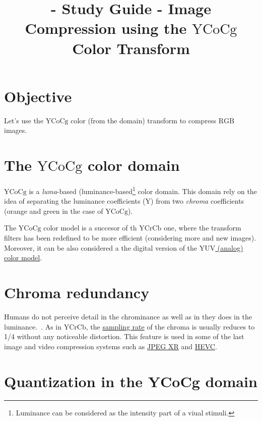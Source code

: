 
 \title{\SM{} - Study Guide - Image
  Compression using the $\text{YCoCg}$ Color Transform}

\maketitle
\tableofcontents

\section{Objective}
Let's use the
\href{https://en.wikipedia.org/wiki/YCbCr}{$\text{YCoCg}$} color (from
the  domain) transform to compress $\text{RGB}$ images.

\section{The $\text{YCoCg}$ color domain}
$\text{YCoCg}$ is a \emph{luma}-based
(luminance-based\footnote{Luminance can be considered as the intensity
part of a viual stimuli.} color domain. This domain rely on the idea
of separating the luminance coefficients (Y) from two \emph{chroma}
coefficients (orange and green in the case of $\text{YCoCg}$).

The $\text{YCoCg}$ color model is a succesor of th $\text{YCrCb}$ one,
where the transform filters has been redefined to be more efficient
(considering more and new images). Moreover, it can be also considered
a the digital version of the
\href{https://en.wikipedia.org/wiki/YUV}{$\text{YUV}$ (analog) color
  model}.

\section{Chroma redundancy}

Humans do not perceive detail in the chrominance as well as in they
does in the
luminance.~\cite{vruiz__visual_redundancy,burger2016digital}. As in
$\text{YCrCb}$, the
\href{https://en.wikipedia.org/wiki/Sampling_(signal_processing)}{sampling
  rate} of the chroma is usually reduces to 1/4 without any noticeable
distortion. This feature is used in some of the last image and video
compression systems such as
\href{https://en.wikipedia.org/wiki/JPEG_XR#Description}{JPEG XR} and
\href{https://en.wikipedia.org/wiki/High_Efficiency_Video_Coding#Video_coding_layer}{HEVC}.

\section{Quantization in the YCoCg domain}

